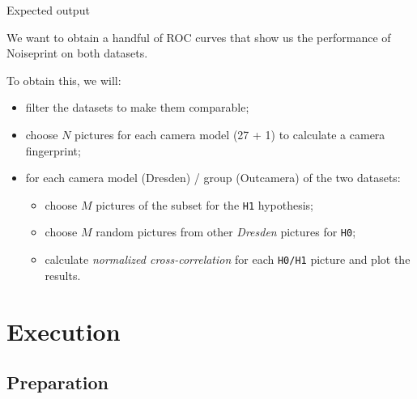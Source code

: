 \begin{frame}{Expected output}

    We want to obtain a handful of ROC curves that show us the performance of Noiseprint on both datasets.
    
    \medskip
    
    To obtain this, we will:
    
    \begin{itemize}
        \item<2-> filter the datasets to make them comparable;
        \item<3-> choose $N$ pictures for each camera model (27 + 1) to calculate a camera fingerprint;
        \item<4-> for each camera model (Dresden) / group (Outcamera) of the two datasets: \begin{itemize}
            \item choose $M$ pictures of the subset for the \texttt{H1} hypothesis;
            \item choose $M$ random pictures from other \textit{Dresden} pictures for \texttt{H0};
            \item calculate \textit{normalized cross-correlation} for each \texttt{H0/H1} picture and plot the results.
        \end{itemize}
    \end{itemize}
    
    
\end{frame}

\section{Execution}

\subsection{Preparation}

